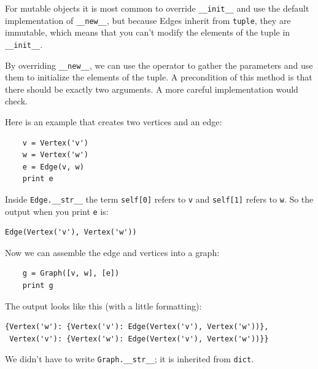 \documentclass[10pt]{book}
\begin{document}
For mutable objects it is most common to override
\verb"__init__" and use the default implementation of
\verb"__new__", but because Edges inherit from {\tt tuple}, they
are immutable, which means that you can't modify the elements
of the tuple in \verb"__init__".

By overriding \verb"__new__", we can use the {\tt *} operator to
gather the parameters and use them to initialize the elements of
the tuple.  A precondition of this method is that there should
be exactly two arguments.  A more careful implementation would
check.

Here is an example that creates two vertices and an edge:
%
\begin{verbatim}
    v = Vertex('v')
    w = Vertex('w')
    e = Edge(v, w)
    print e
\end{verbatim}
%
Inside \verb"Edge.__str__" the term {\tt self[0]} refers
to {\tt v} and {\tt self[1]} refers to {\tt w}.  So the output
when you print {\tt e} is:
%
\begin{verbatim}
Edge(Vertex('v'), Vertex('w'))
\end{verbatim}
%
Now we can assemble the edge and vertices into a graph:
%
\begin{verbatim}
    g = Graph([v, w], [e])
    print g
\end{verbatim}
%
The output looks like this (with a little formatting):
%
\begin{verbatim}
{Vertex('w'): {Vertex('v'): Edge(Vertex('v'), Vertex('w'))},
 Vertex('v'): {Vertex('w'): Edge(Vertex('v'), Vertex('w'))}}
\end{verbatim}
%
We didn't have to write \verb"Graph.__str__"; it is inherited
from {\tt dict}.
\end{document}
